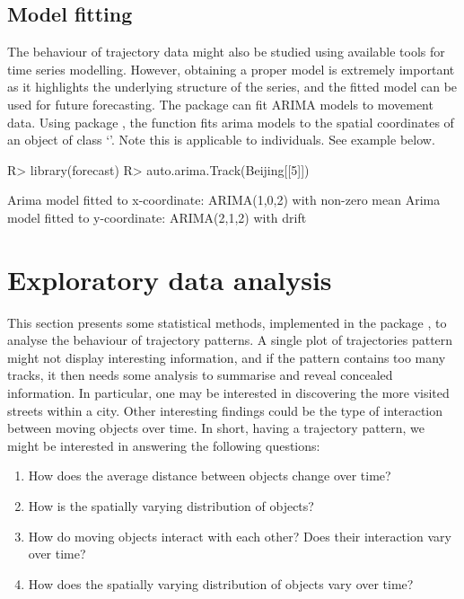 \documentclass[article]{jss}
\newcommand{\class}[1]{`\code{#1}'}
\begin{document}
 \subsection{Model fitting}
  The behaviour of trajectory data might also be studied using available tools for time series modelling. However, obtaining a proper model is extremely important as it highlights the
  underlying structure of the series, and the fitted model can be used for future forecasting. The  package
   can fit ARIMA models to movement data. Using  package , the function  fits arima models to the spatial coordinates of an object of class \class{Track}. Note this is applicable to individuals. See example below.

\begin{Schunk}
\begin{Sinput}
R> library(forecast)
R> auto.arima.Track(Beijing[[5]])
\end{Sinput}
\begin{Soutput}
Arima model fitted to x-coordinate: ARIMA(1,0,2) with non-zero mean 
Arima model fitted to y-coordinate: ARIMA(2,1,2) with drift
\end{Soutput}
\end{Schunk}

\section{Exploratory data analysis} \label{sec:explo}
  This section presents some statistical methods, implemented in the  package , to analyse the behaviour of trajectory patterns. A single plot of trajectories pattern might not display interesting information, and if the pattern contains too many tracks, it then needs some analysis to summarise and reveal concealed information. In particular, one may be interested in discovering the more visited streets within a city. Other interesting findings could be the type of interaction between moving objects over time. In short, having a trajectory pattern, we might be interested in answering the following questions:
  \begin{enumerate}
  \item How does the average distance between objects change over time?
  \item How is the spatially varying distribution of objects?
  \item How do moving objects interact with each other? Does their interaction vary over time?
  \item How does the spatially varying distribution of objects vary over time?
  \end{enumerate}
\end{document}
